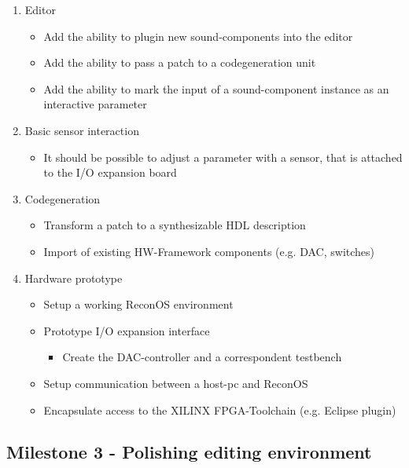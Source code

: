	\begin{enumerate}
		\item Editor
			\begin{itemize}
				\item Add the ability to plugin new sound-components into the editor
				\item Add the ability to pass a patch to a codegeneration unit
				\item Add the ability to mark the input of a sound-component instance as an interactive parameter
			\end{itemize}
		\item Basic sensor interaction
			\begin{itemize}
				\item It should be possible to adjust a parameter with a sensor, that is attached to the I/O expansion board
			\end{itemize}
		\item Codegeneration	
			\begin{itemize}
				\item Transform a patch to a synthesizable HDL description
				\item Import of existing HW-Framework components (e.g. \ac{DAC}, switches)
			\end{itemize}
		\item Hardware prototype %
			\begin{itemize}
				\item Setup a working ReconOS environment
				\item Prototype I/O expansion interface
				\begin{itemize}
					\item Create the DAC-controller and a correspondent testbench
				\end{itemize}
				\item Setup communication between a host-pc and ReconOS
				\item Encapsulate access to the XILINX \ac{FPGA}-Toolchain (e.g. Eclipse plugin)
			\end{itemize}
	\end{enumerate}

\subsection{Milestone 3 - Polishing editing environment}

